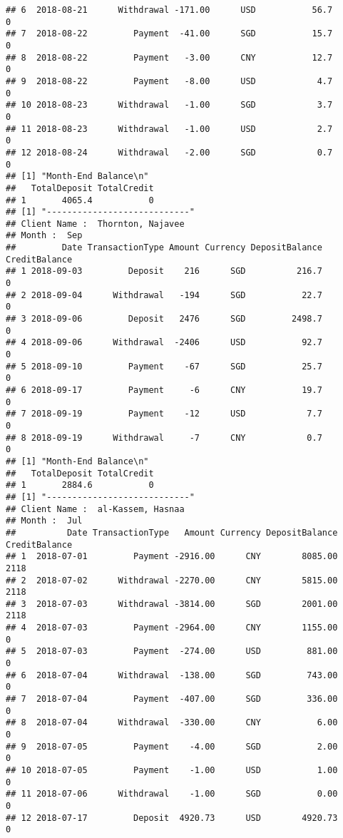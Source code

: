 \documentclass[]{article}
\begin{document}
\begin{verbatim}
## 6  2018-08-21      Withdrawal -171.00      USD           56.7             0
## 7  2018-08-22         Payment  -41.00      SGD           15.7             0
## 8  2018-08-22         Payment   -3.00      CNY           12.7             0
## 9  2018-08-22         Payment   -8.00      USD            4.7             0
## 10 2018-08-23      Withdrawal   -1.00      SGD            3.7             0
## 11 2018-08-23      Withdrawal   -1.00      USD            2.7             0
## 12 2018-08-24      Withdrawal   -2.00      SGD            0.7             0
## [1] "Month-End Balance\n"
##   TotalDeposit TotalCredit
## 1       4065.4           0
## [1] "----------------------------"
## Client Name :  Thornton, Najavee 
## Month :  Sep 
##         Date TransactionType Amount Currency DepositBalance CreditBalance
## 1 2018-09-03         Deposit    216      SGD          216.7             0
## 2 2018-09-04      Withdrawal   -194      SGD           22.7             0
## 3 2018-09-06         Deposit   2476      SGD         2498.7             0
## 4 2018-09-06      Withdrawal  -2406      USD           92.7             0
## 5 2018-09-10         Payment    -67      SGD           25.7             0
## 6 2018-09-17         Payment     -6      CNY           19.7             0
## 7 2018-09-19         Payment    -12      USD            7.7             0
## 8 2018-09-19      Withdrawal     -7      CNY            0.7             0
## [1] "Month-End Balance\n"
##   TotalDeposit TotalCredit
## 1       2884.6           0
## [1] "----------------------------"
## Client Name :  al-Kassem, Hasnaa 
## Month :  Jul 
##          Date TransactionType   Amount Currency DepositBalance CreditBalance
## 1  2018-07-01         Payment -2916.00      CNY        8085.00          2118
## 2  2018-07-02      Withdrawal -2270.00      CNY        5815.00          2118
## 3  2018-07-03      Withdrawal -3814.00      SGD        2001.00          2118
## 4  2018-07-03         Payment -2964.00      CNY        1155.00             0
## 5  2018-07-03         Payment  -274.00      USD         881.00             0
## 6  2018-07-04      Withdrawal  -138.00      SGD         743.00             0
## 7  2018-07-04         Payment  -407.00      SGD         336.00             0
## 8  2018-07-04      Withdrawal  -330.00      CNY           6.00             0
## 9  2018-07-05         Payment    -4.00      SGD           2.00             0
## 10 2018-07-05         Payment    -1.00      USD           1.00             0
## 11 2018-07-06      Withdrawal    -1.00      SGD           0.00             0
## 12 2018-07-17         Deposit  4920.73      USD        4920.73             0

\end{verbatim}
\end{document}
